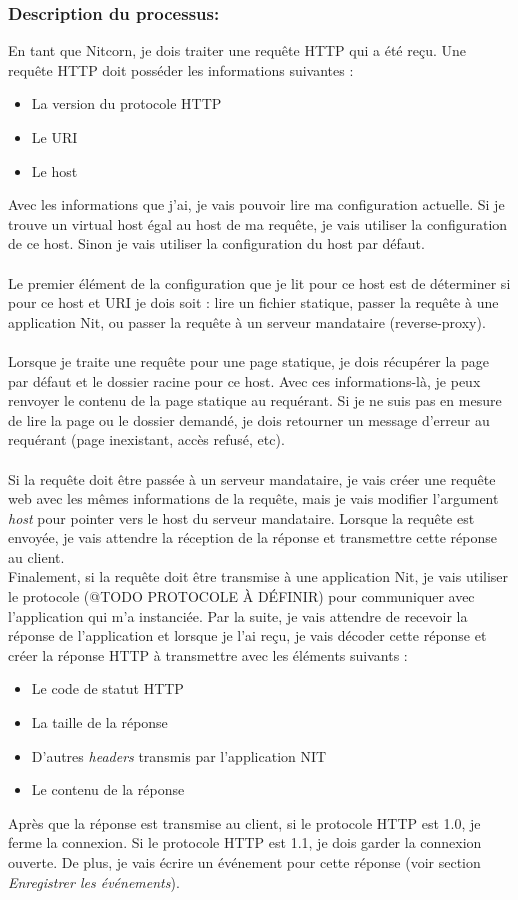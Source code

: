 \documentclass{scrreprt}
\begin{document}
\subsubsection{Description du processus:}En tant que Nitcorn, je dois traiter une requête HTTP qui a été reçu. Une requête
HTTP doit posséder les informations suivantes :
\begin{itemize}
    \item La version du protocole HTTP
    \item Le URI
    \item Le host
\end{itemize}
Avec les informations que j'ai, je vais pouvoir lire ma configuration actuelle. Si
je trouve un virtual host égal au host de ma requête, je vais utiliser la configuration
de ce host. Sinon je vais utiliser la configuration du host par défaut. \\
\\
Le premier élément de la configuration que je lit pour ce host est de déterminer
si pour ce host et URI je dois soit : lire un fichier statique, passer la requête
à une application Nit, ou passer la requête à un serveur mandataire (reverse-proxy).\\
\\
Lorsque je traite une requête pour une page statique, je dois récupérer la page par
défaut et le dossier racine pour ce host. Avec ces informations-là, je peux renvoyer
le contenu de la page statique au requérant. Si je ne suis pas en mesure de lire
la page ou le dossier demandé, je dois retourner un message d'erreur au requérant
(page inexistant, accès refusé, etc).\\
\\
Si la requête doit être passée à un serveur mandataire, je vais créer
une requête web avec les mêmes informations de la requête, mais je vais modifier
l'argument \textit{host} pour pointer vers le host du serveur mandataire. Lorsque
la requête est envoyée, je vais attendre la réception de la réponse et transmettre
cette réponse au client.
\\
Finalement, si la requête doit être transmise à une application Nit, je vais utiliser
le protocole (@TODO PROTOCOLE À DÉFINIR) pour communiquer avec l'application
qui m'a instanciée. Par la suite, je vais attendre de recevoir la réponse de l'application
et lorsque je l'ai reçu, je vais décoder cette réponse et créer la réponse HTTP
à transmettre avec les éléments suivants :
\begin{itemize}
    \item Le code de statut HTTP
    \item La taille de la réponse
    \item D'autres \textit{headers} transmis par l'application NIT
    \item Le contenu de la réponse
\end{itemize}
Après que la réponse est transmise au client, si le protocole HTTP est 1.0, je ferme
la connexion. Si le protocole HTTP est 1.1, je dois garder la connexion
ouverte. De plus, je vais écrire un événement pour cette réponse (voir section
\textit{Enregistrer les événements}).
\end{document}

